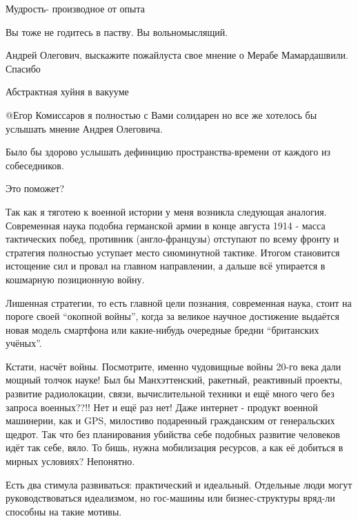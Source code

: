 \begin{multicols}{2}
Мудрость- производное от опыта

\begin{itemize} %
Вы тоже не годитесь в паству. Вы вольномыслящий.
\end{itemize} %

Андрей Олегович, выскажите пожайлуста свое мнение о Мерабе Мамардашвили. Спасибо

\begin{itemize} %
Абстрактная хуйня в вакууме

 @Егор Комиссаров  я полностью с Вами солидарен но все же хотелось бы услышать мнение Андрея Олеговича.
\end{itemize} %

Было бы здорово услышать дефиницию пространства-времени от каждого из собеседников.

Это поможет?


Так как я тяготею к военной истории у меня возникла следующая аналогия.
Современная наука подобна германской армии в конце августа 1914 - масса
тактических побед, противник (англо-французы) отступают по всему фронту и
стратегия полностью уступает место сиюминутной тактике. Итогом становится
истощение сил и провал на главном направлении, а дальше всё упирается в
кошмарную позиционную войну.

Лишенная стратегии, то есть главной цели познания, современная наука, стоит на
пороге своей \enquote{окопной войны}, когда за великое научное достижение выдаётся
новая модель смартфона или какие-нибудь очередные бредни \enquote{британских учёных}. 

Кстати, насчёт войны. Посмотрите, именно чудовищные войны 20-го века дали
мощный толчок науке! Был бы Манхэттенский, ракетный, реактивный проекты,
развитие радиолокации, связи, вычислительной техники и ещё много чего без
запроса военных??!! Нет и ещё раз нет! Даже интернет - продукт военной
машинерии, как и GPS, милостиво подаренный гражданским от генеральских щедрот.
Так что без планирования убийства себе подобных развитие человеков идёт так
себе, вяло. То бишь, нужна мобилизация ресурсов, а как её добиться в мирных
условиях? Непонятно.

Есть два стимула развиваться: практический и идеальный. Отдельные люди могут
руководствоваться идеализмом, но гос-машины или бизнес-структуры вряд-ли
способны на такие мотивы.


\end{multicols}
